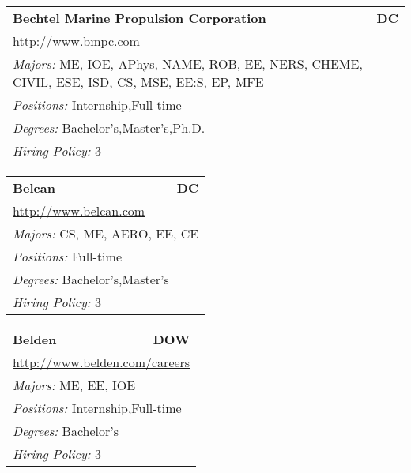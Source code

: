\documentclass[twoside]{article}
\begin{document}
\begin{center}
\begin{multicols}{3}
\begin{FlushLeft}
\begin{minipage}{.9\columnwidth}
\end{minipage}
 
\begin{minipage}{.9\columnwidth}\begin{tabularx}{.95\columnwidth}{Xr}
                 {\Large\bf Bechtel Marine Propulsion Corporation} & {\Large\bf DC}\\
    \multicolumn{2}{p{.95\columnwidth}}{\url{http://www.bmpc.com}}\\
    \multicolumn{2}{p{.95\columnwidth}}{\emph{Majors:} ME, IOE, APhys, NAME, ROB, EE, NERS, CHEME, CIVIL, ESE, ISD, CS, MSE, EE:S, EP, MFE}\\
    \multicolumn{2}{p{.95\columnwidth}}{\emph{Positions:} Internship,Full-time}\\
    \multicolumn{2}{p{.95\columnwidth}}{\emph{Degrees:} Bachelor's,Master's,Ph.D.}\\
    \multicolumn{2}{p{.95\columnwidth}}{\emph{Hiring Policy:} 3}\\
    \end{tabularx}
    
\end{minipage}
 
\begin{minipage}{.9\columnwidth}\begin{tabularx}{.95\columnwidth}{Xr}
                 {\Large\bf Belcan} & {\Large\bf DC}\\
    \multicolumn{2}{p{.95\columnwidth}}{\url{http://www.belcan.com}}\\
    \multicolumn{2}{p{.95\columnwidth}}{\emph{Majors:} CS, ME, AERO, EE, CE}\\
    \multicolumn{2}{p{.95\columnwidth}}{\emph{Positions:} Full-time}\\
    \multicolumn{2}{p{.95\columnwidth}}{\emph{Degrees:} Bachelor's,Master's}\\
    \multicolumn{2}{p{.95\columnwidth}}{\emph{Hiring Policy:} 3}\\
    \end{tabularx}
    
\end{minipage}
 
\begin{minipage}{.9\columnwidth}\begin{tabularx}{.95\columnwidth}{Xr}
                 {\Large\bf Belden} & {\Large\bf DOW}\\
    \multicolumn{2}{p{.95\columnwidth}}{\url{http://www.belden.com/careers}}\\
    \multicolumn{2}{p{.95\columnwidth}}{\emph{Majors:} ME, EE, IOE}\\
    \multicolumn{2}{p{.95\columnwidth}}{\emph{Positions:} Internship,Full-time}\\
    \multicolumn{2}{p{.95\columnwidth}}{\emph{Degrees:} Bachelor's}\\
    \multicolumn{2}{p{.95\columnwidth}}{\emph{Hiring Policy:} 3}\\
    \end{tabularx}
    

\end{minipage}
\end{FlushLeft}
\end{multicols}
\end{center}
\end{document}
